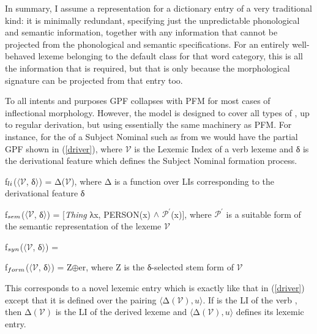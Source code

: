 \documentclass[output=paper,
modfonts
]{LSP/langsci}
\begin{document}
\largerpage[-1]%
In summary, I assume a representation for a dictionary entry of a very traditional kind: it is minimally redundant, specifying just the unpredictable phonological and semantic information, together with any  information that cannot be projected from the phonological and semantic specifications. 
 For an entirely well-behaved lexeme belonging to the default  class for that word category, this is all the information that is required, but that is only because the morphological signature can be projected from that entry too. 


To all intents and purposes GPF collapses with PFM for most cases of inflectional morphology. However, the model is designed to cover all types of , up to regular derivation, but using essentially the same machinery as PFM. For instance, for the  of a Subject Nominal such as  from  we would have the partial GPF shown in (\ref{driver}), where $\mathcal{V}$ is the Lexemic Index of a verb lexeme and δ is the derivational feature which defines the Subject Nominal formation process.

\begin{exe}
\ex	\label{driver}

	\begin{xlist}

\ex	f$\sb{li}$($\langle$$\mathcal{V}$, δ$\rangle$) = Δ($\mathcal{V}$), where Δ is a function over LIs corresponding to the derivational feature δ

\ex	f$\sb{sem}$($\langle$$\mathcal{V}$, δ$\rangle$) = 	 [\mbox{\textit{Thing}} λx, PERSON(x) $\wedge$ $\mathcal{P}^{\prime}$(x)],  where $\mathcal{P}^{\prime}$ is a suitable form of the semantic representation of the lexeme $\mathcal{V}$
	
\ex	f$\sb{syn}$($\langle$$\mathcal{V}$, δ$\rangle$) = 

	

\ex	f$\sb{form}$($\langle$$\mathcal{V}$, δ$\rangle$) = Z$\oplus$er, where Z is the δ-selected stem form of $\mathcal{V}$

	\end{xlist}
\end{exe}%

\noindent
This corresponds to a novel lexemic entry which is exactly like that in (\ref{driver}) except that it is  defined over the pairing $\langle$Δ$(\mathcal{V}),\textit{u}\rangle$. If  is the LI of the verb , then Δ$(\mathcal{V})$ is the LI of the derived lexeme  and   $\langle$Δ$(\mathcal{V}),\textit{u}\rangle$ defines its lexemic entry.
\end{document}
